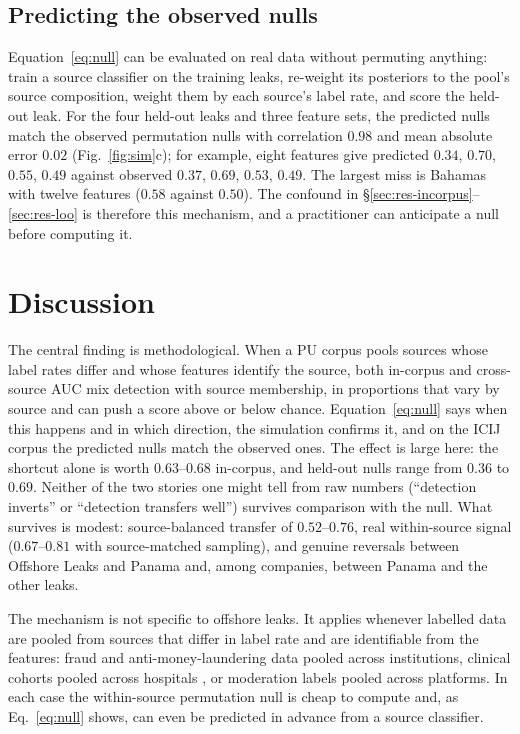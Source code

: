 \documentclass[11pt]{article}
\begin{document}
\subsection{Predicting the observed nulls}
Equation~\eqref{eq:null} can be evaluated on real data without permuting anything:
train a source classifier on the training leaks, re-weight its posteriors to the
pool's source composition, weight them by each source's label rate, and score the
held-out leak. For the four held-out leaks and three feature sets, the predicted
nulls match the observed permutation nulls with correlation $0.98$ and mean absolute
error $0.02$ (Fig.~\ref{fig:sim}c); for example, eight features give predicted
$0.34$, $0.70$, $0.55$, $0.49$ against observed $0.37$, $0.69$, $0.53$, $0.49$. The
largest miss is Bahamas with twelve features ($0.58$ against $0.50$). The confound in
\S\ref{sec:res-incorpus}--\ref{sec:res-loo} is therefore this mechanism, and a
practitioner can anticipate a null before computing it.

\section{Discussion}\label{sec:disc}
The central finding is methodological. When a PU corpus pools sources whose label
rates differ and whose features identify the source, both in-corpus and
cross-source AUC mix detection with source membership, in proportions that vary
by source and can push a score above or below chance. Equation~\eqref{eq:null}
says when this happens and in which direction, the simulation confirms it, and on
the ICIJ corpus the predicted nulls match the observed ones. The effect is large
here: the shortcut alone is worth $0.63$--$0.68$ in-corpus, and held-out nulls range
from $0.36$ to $0.69$. Neither of the two stories one might tell from raw numbers
(``detection inverts'' or ``detection transfers well'') survives comparison with
the null. What survives is modest: source-balanced transfer of $0.52$--$0.76$, real
within-source signal ($0.67$--$0.81$ with source-matched sampling), and genuine
reversals between Offshore Leaks and Panama and, among companies, between Panama
and the other leaks.

The mechanism is not specific to offshore leaks. It applies whenever labelled data
are pooled from sources that differ in label rate and are identifiable from the
features: fraud and anti-money-laundering data pooled across institutions,
clinical cohorts pooled across hospitals \citep{zech2018variable}, or moderation
labels pooled across platforms. In each case the within-source permutation null is
cheap to compute and, as Eq.~\eqref{eq:null} shows, can even be predicted in advance
from a source classifier.
\end{document}
